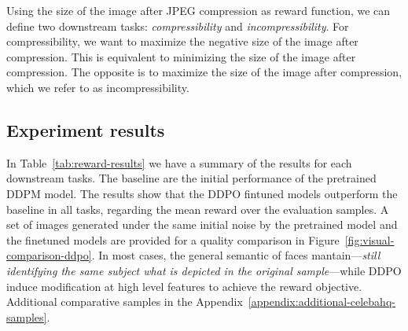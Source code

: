 \noindent Using the size of the image after JPEG compression as reward function, we can define two downstream tasks: \textit{compressibility} and \textit{incompressibility}. For compressibility, we want to maximize the negative size of the image after compression. This is equivalent to minimizing the size of the image after compression. The opposite is to maximize the size of the image after compression, which we refer to as incompressibility. \\


\subsection{Experiment results}

In Table~\ref{tab:reward-results} we have a summary of the results for each downstream tasks. The baseline are the initial performance of the pretrained DDPM model. The results show that the DDPO fintuned models outperform the baseline in all tasks, regarding the mean reward over the evaluation samples. A set of images generated under the same initial noise by the pretrained model and the finetuned models are provided for a quality comparison in Figure~\ref{fig:visual-comparison-ddpo}. In most cases, the general semantic of faces mantain---\textit{still identifying the same subject what
is depicted in the original sample}---while DDPO induce modification at high level features to achieve the reward objective. Additional comparative samples in the Appendix~\ref{appendix:additional-celebahq-samples}. \\

